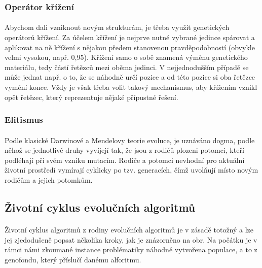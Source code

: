 \documentclass[bc,male,java,dept460]{diploma}		%
\begin{document}
\subsubsection{Operátor křížení}
\paragraph*{}
Abychom dali vzniknout novým strukturám, je třeba  využít genetických operátorů křížení. Za účelem křížení je nejprve nutné vybrané jedince spárovat a aplikovat na ně křížení s nějakou předem stanovenou pravděpodobností (obvykle velmi vysokou, např. 0,95). Křížení samo o sobě znamená výměnu genetického materiálu, tedy částí řetězců mezi oběma jedinci. V nejjednodušším případě se může jednat např. o to, že se náhodně určí pozice a od této pozice si oba řetězce vymění konce. Vždy je však třeba volit takový mechanismus, aby křížením vznikl opět řetězec, který reprezentuje nějaké přípustné řešení.


\subsubsection{Elitismus}
\paragraph*{}
Podle klasické Darwinové a Mendelovy teorie evoluce, je uznáváno dogma, podle něhož se jednotlivé druhy vyvíjejí tak, že jsou z rodičů
plozeni potomci, kteří podléhají při svém vzniku mutacím. Rodiče a potomci nevhodní pro aktuální životní prostředí vymírají cyklicky po tzv. generacích, čímž uvolňují místo novým rodičům a jejich potomkům.

\subsection{Životní cyklus evolučních algoritmů}

\paragraph*{}
Životní cyklus algoritmů z rodiny evolučních algoritmů je v zásadě totožný a lze jej zjedodušeně popsat několika kroky, jak je znázorněno na obr. Na počátku je v rámci námi zkoumané instance problématiky náhodně vytvořena populace, a to z genofondu, který příslučí danému alforitmu.
\end{document}
